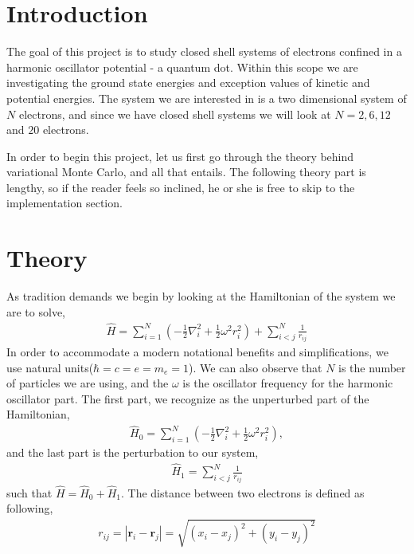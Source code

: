 \documentclass[11pt]{article}
\begin{document}
\tableofcontents

\section{Introduction}
The goal of this project is to study closed shell systems of electrons confined in a harmonic oscillator potential - a quantum dot. Within this scope we are investigating the ground state energies and exception values of kinetic and potential energies. The system we are interested in is a two dimensional system of $N$ electrons, and since we have closed shell systems we will look at $N=2,6,12$ and $20$ electrons.

In order to begin this project, let us first go through the theory behind variational Monte Carlo, and all that entails. The following theory part is lengthy, so if the reader feels so inclined, he or she is free to skip to the implementation section.

\section{Theory}
As tradition demands we begin by looking at the Hamiltonian of the system we are to solve,
\begin{align}
	\hat{H} = \sum^N_{i=1} \left( -\frac{1}{2}\nabla^2_i + \frac{1}{2}\omega^2r^2_i \right) + \sum^N_{i<j} \frac{1}{r_{ij}}
	\label{eq:hamiltonian}
\end{align}
In order to accommodate a modern notational benefits and simplifications, we use natural units($\hbar = c = e = m_e = 1$). We can also observe that $N$ is the number of particles we are using, and the $\omega$ is the oscillator frequency for the harmonic oscillator part. The first part, we recognize as the unperturbed part of the Hamiltonian,
\begin{align}
	\hat{H}_0 = \sum^N_{i=1} \left( -\frac{1}{2}\nabla^2_i + \frac{1}{2}\omega^2r^2_i \right),
	\label{eq:hamiltonian_unperturbed}
\end{align}
and the last part is the perturbation to our system,
\begin{align}
	\hat{H}_1 = \sum^N_{i<j} \frac{1}{r_{ij}}
	\label{eq:hamiltonian_perturbed}
\end{align}
such that $\hat{H} = \hat{H}_0 + \hat{H}_1$. The distance between two electrons is defined as following,
\begin{align}
	r_{ij} = |\mathbf{r}_i - \mathbf{r}_j| = \sqrt{(x_i - x_j)^2 + (y_i - y_j)^2}
	\label{eq:electron_distance}
\end{align}
\end{document}
